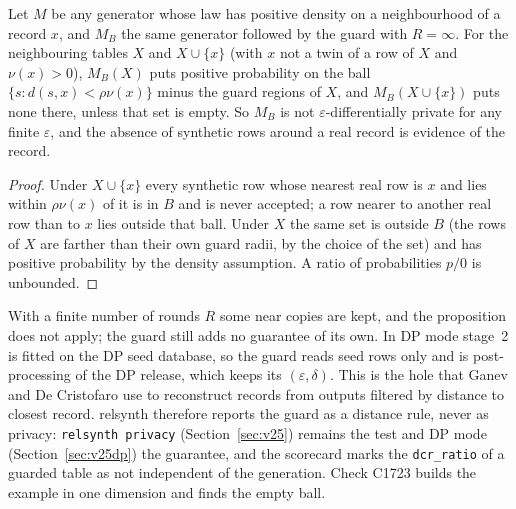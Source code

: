 \setcounter{proposition}{1722}
\begin{proposition}\label{prop:ncnotdp}
Let $M$ be any generator whose law has positive density on a neighbourhood of a record $x$, and $M_B$ the same generator followed by the guard with $R=\infty$. For the neighbouring tables $X$ and $X\cup\{x\}$ (with $x$ not a twin of a row of $X$ and $\nu(x)>0$), $M_B(X)$ puts positive probability on the ball $\{s: d(s,x)<\rho\nu(x)\}$ minus the guard regions of $X$, and $M_B(X\cup\{x\})$ puts none there, unless that set is empty. So $M_B$ is not $\varepsilon$-differentially private for any finite $\varepsilon$, and the absence of synthetic rows around a real record is evidence of the record.
\end{proposition}
\begin{proof}
Under $X\cup\{x\}$ every synthetic row whose nearest real row is $x$ and lies within $\rho\nu(x)$ of it is in $B$ and is never accepted; a row nearer to another real row than to $x$ lies outside that ball. Under $X$ the same set is outside $B$ (the rows of $X$ are farther than their own guard radii, by the choice of the set) and has positive probability by the density assumption. A ratio of probabilities $p/0$ is unbounded.
\end{proof}
\noindent With a finite number of rounds $R$ some near copies are kept, and the proposition does not apply; the guard still adds no guarantee of its own. In DP mode stage~2 is fitted on the DP seed database, so the guard reads seed rows only and is post-processing of the DP release, which keeps its $(\varepsilon,\delta)$. This is the hole that Ganev and De Cristofaro \cite{ganev2023dcr} use to reconstruct records from outputs filtered by distance to closest record. relsynth therefore reports the guard as a distance rule, never as privacy: \texttt{relsynth privacy} (Section~\ref{sec:v25}) remains the test and DP mode (Section~\ref{sec:v25dp}) the guarantee, and the scorecard marks the \texttt{dcr\_ratio} of a guarded table as not independent of the generation. Check C1723 builds the example in one dimension and finds the empty ball.

